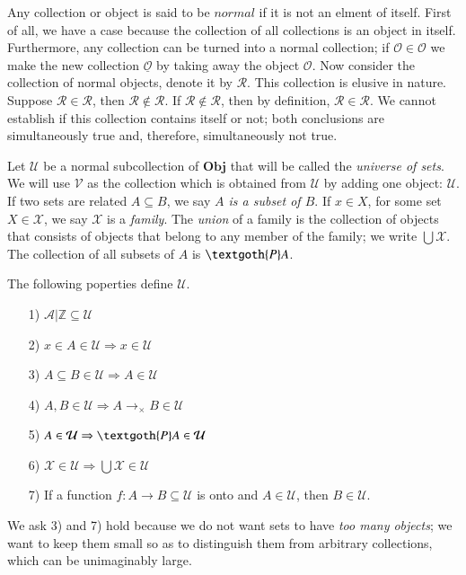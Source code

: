 \documentclass [12pt]{book}
\begin{document}
Any collection or object is said to be $normal$ if it is not an elment of itself. First of all, we have a case because the collection of all collections is an object in itself. Furthermore, any collection can be turned into a normal collection; if $\mathcal O\in\mathcal O$ we make the new collection $\underline{\mathcal O}$ by taking away the object $\mathcal O$. Now consider the collection of normal objects, denote it by $\mathcal R$. This collection is elusive in nature. Suppose $\mathcal R\in\mathcal R$, then $\mathcal R\notin\mathcal R$. If $\mathcal R\notin\mathcal R$, then by definition, $\mathcal R\in\mathcal R$. We cannot establish if this collection contains itself or not; both conclusions are simultaneously true and, therefore, simultaneously not true.

Let $\mathcal U$ be a normal subcollection of $\textbf{Obj}$ that will be called the \textit{universe of sets}. We will use $\mathcal{V}$ as the collection which is obtained from $\mathcal{U}$ by adding one object: $\mathcal{U}$. If two sets are related $A\subseteq B$, we say \textit{$A$ is a subset of $B$}. If $x\in X$, for some set $X\in\mathcal{X}$, we say $\mathcal{X}$ is a \textit{family}. The \textit{union} of a family is the collection of objects that consists of objects that belong to any member of the family; we write $\bigcup\mathcal{X}$. The collection of all subsets of $A$ is $\textgoth{P}A$.

\begin{definition}The following poperties define $\mathcal{U}$.\begin{itemize}\item[1)]$\mathcal{A|}\mathbb{Z}\subseteq\mathcal{U}$\item[2)]$x
\in A\in \mathcal{U}\Rightarrow x\in\mathcal{U}$\item[3)]$A\subseteq B\in\mathcal{U}\Rightarrow A\in\mathcal{U}$\item[4)]$A,B\in\mathcal{U}\Rightarrow A\rightarrow_{\times}B\in\mathcal{U}$
\item[5)]$A\in\mathcal{U}\Rightarrow\textgoth{P}A\in\mathcal{U}$\item[6)]
$\mathcal{X}\in\mathcal{U}\Rightarrow\bigcup\mathcal{X}\in\mathcal{U}$\item[7)]
If a function $f:A\rightarrow B\subseteq\mathcal{U}$ is onto and $A\in\mathcal{U}$, then $B\in\mathcal{U}$.
\end{itemize}\end{definition}

We ask 3) and 7) hold because we do not want sets to have \textit{too many objects}; we want to keep them small so as to distinguish them from arbitrary collections, which can be unimaginably large. 
\end{document}
